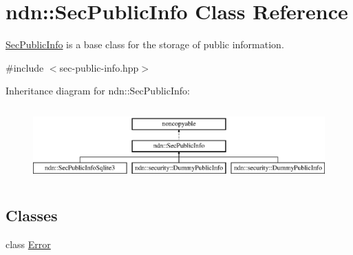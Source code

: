 \hypertarget{classndn_1_1SecPublicInfo}{}\section{ndn\+:\+:Sec\+Public\+Info Class Reference}
\label{classndn_1_1SecPublicInfo}


\hyperlink{classndn_1_1SecPublicInfo}{Sec\+Public\+Info} is a base class for the storage of public information.  




{\ttfamily \#include $<$sec-\/public-\/info.\+hpp$>$}

Inheritance diagram for ndn\+:\+:Sec\+Public\+Info\+:\begin{figure}[H]
\begin{center}
\leavevmode
\includegraphics[height=2.871795cm]{classndn_1_1SecPublicInfo}
\end{center}
\end{figure}
\subsection*{Classes}
\begin{DoxyCompactItemize}
\item 
class \hyperlink{classndn_1_1SecPublicInfo_1_1Error}{Error}
\end{DoxyCompactItemize}
